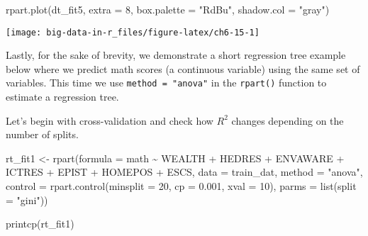 \documentclass[
]{book}
\newenvironment{Shaded}{\begin{snugshade}}{\end{snugshade}}
\newcommand{\AttributeTok}[1]{\textcolor[rgb]{0.77,0.63,0.00}{#1}}
\newcommand{\DecValTok}[1]{\textcolor[rgb]{0.00,0.00,0.81}{#1}}
\newcommand{\FloatTok}[1]{\textcolor[rgb]{0.00,0.00,0.81}{#1}}
\newcommand{\FunctionTok}[1]{\textcolor[rgb]{0.00,0.00,0.00}{#1}}
\newcommand{\NormalTok}[1]{#1}
\newcommand{\OtherTok}[1]{\textcolor[rgb]{0.56,0.35,0.01}{#1}}
\newcommand{\SpecialCharTok}[1]{\textcolor[rgb]{0.00,0.00,0.00}{#1}}
\newcommand{\StringTok}[1]{\textcolor[rgb]{0.31,0.60,0.02}{#1}}
\begin{document}
\begin{Shaded}
\begin{Highlighting}[]
\FunctionTok{rpart.plot}\NormalTok{(dt\_fit5, }\AttributeTok{extra =} \DecValTok{8}\NormalTok{, }\AttributeTok{box.palette =} \StringTok{"RdBu"}\NormalTok{, }\AttributeTok{shadow.col =} \StringTok{"gray"}\NormalTok{)}
\end{Highlighting}
\end{Shaded}

\texttt{[image: big-data-in-r\_files/figure-latex/ch6-15-1]}

Lastly, for the sake of brevity, we demonstrate a short regression tree example below where we predict math scores (a continuous variable) using the same set of variables. This time we use \texttt{method\ =\ "anova"} in the \texttt{rpart()} function to estimate a regression tree.

Let's begin with cross-validation and check how \(R^2\) changes depending on the number of splits.

\begin{Shaded}
\begin{Highlighting}[]
\NormalTok{rt\_fit1 }\OtherTok{\textless{}{-}} \FunctionTok{rpart}\NormalTok{(}\AttributeTok{formula =}\NormalTok{ math }\SpecialCharTok{\textasciitilde{}}\NormalTok{ WEALTH }\SpecialCharTok{+}\NormalTok{ HEDRES }\SpecialCharTok{+}\NormalTok{ ENVAWARE }\SpecialCharTok{+} 
\NormalTok{                  ICTRES }\SpecialCharTok{+}\NormalTok{ EPIST }\SpecialCharTok{+}\NormalTok{ HOMEPOS }\SpecialCharTok{+}\NormalTok{ ESCS,}
                 \AttributeTok{data =}\NormalTok{ train\_dat,}
                 \AttributeTok{method =} \StringTok{"anova"}\NormalTok{, }
                 \AttributeTok{control =} \FunctionTok{rpart.control}\NormalTok{(}\AttributeTok{minsplit =} \DecValTok{20}\NormalTok{,}
                                         \AttributeTok{cp =} \FloatTok{0.001}\NormalTok{,}
                                         \AttributeTok{xval =} \DecValTok{10}\NormalTok{),}
                \AttributeTok{parms =} \FunctionTok{list}\NormalTok{(}\AttributeTok{split =} \StringTok{"gini"}\NormalTok{))}

\FunctionTok{printcp}\NormalTok{(rt\_fit1)}
\end{Highlighting}
\end{Shaded}
\end{document}
